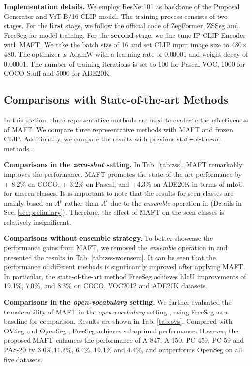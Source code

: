 \noindent \textbf{Implementation details.}
We employ ResNet101 as backbone of the Proposal Generator and ViT-B/16 CLIP model. The training process  consists of two stages.
For the \textbf{first} stage, we follow the official code of ZegFormer, ZSSeg and FreeSeg for model training. 
For the \textbf{second} stage, we fine-tune IP-CLIP Encoder with MAFT. We take the batch size
of 16 and set CLIP input image size to 480$\times$480. The optimizer is AdamW with a learning rate of 0.00001 and weight decay of 0.00001. The number of training iterations is set to 100 for Pascal-VOC, 1000 for COCO-Stuff and 5000 for ADE20K.

\subsection{Comparisons with State-of-the-art Methods}

In this section, three representative methods are used  \cite{zegformer, zsseg, freeseg} to evaluate the effectiveness of MAFT. We compare three representative methods with MAFT and frozen CLIP. Additionally, we compare the results with previous state-of-the-art methods  \cite{spnet, zs5, cagnet, STRICT}.

\noindent \textbf{Comparisons in the \textit{zero-shot} setting.}
In Tab. \ref{tab:zss}, MAFT remarkably improves the performance. MAFT promotes the state-of-the-art performance by + 8.2\% on COCO, + 3.2\% on Pascal, and +4.3\% on ADE20K in terms of mIoU for unseen classes. It is important to note that the results for seen classes are mainly based on $A^p$ rather than $A^c$ due to the \textit{ensemble} operation in \cite{zegformer, zsseg, freeseg} (Details in Sec. \ref{sec:prelimiary}). Therefore, the effect of MAFT on the seen classes is relatively insignificant. 

\noindent \textbf{Comparisons without ensemble strategy.}
To better showcase the performance gains from MAFT, we removed the \textit{ensemble} operation in \cite{zegformer, zsseg, freeseg} and presented the results in Tab. \ref{tab:zss-woensem}.  It can be seen that the performance of different methods is significantly improved after applying MAFT. In particular, the state-of-the-art method FreeSeg achieves hIoU improvements of 19.1\%, 7.0\%, and 8.3\% on COCO, VOC2012 and ADE20K datasets. 

\noindent \textbf{Comparisons in the \textit{open-vocabulary} setting.}
We further evaluated the transferability of MAFT in the \textit{open-vocabulary} setting \cite{ovseg, zsseg}, using FreeSeg as a baseline for comparison. Results are shown in Tab. \ref{tab:ovs}.
Compared with OVSeg \cite{ovseg} and OpenSeg \cite{ghiasi2022scaling}, FreeSeg achieves suboptimal performance. However, the proposed MAFT enhances the performance of A-847, A-150, PC-459, PC-59 and PAS-20 by 3.0\%,11.2\%, 6.4\%, 19.1\% and 4.4\%, and outperforms OpenSeg on all five datasets.

